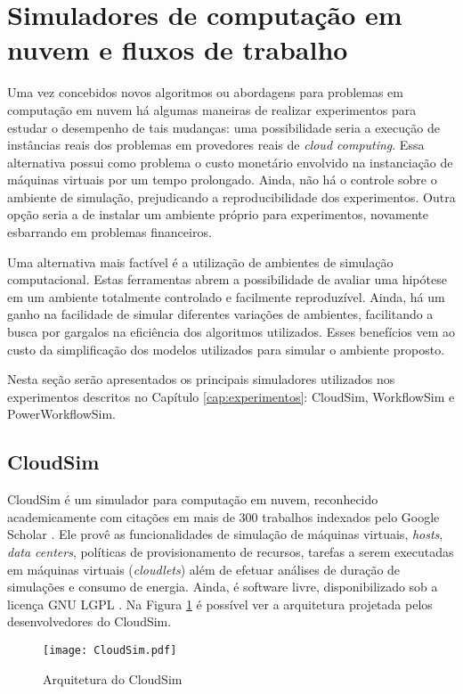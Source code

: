 \section{Simuladores de computação em nuvem e fluxos de trabalho}
\label{sec:ambiente_simulacao}
Uma vez concebidos novos algoritmos ou abordagens para problemas em computação
em nuvem há algumas maneiras de realizar experimentos para estudar o desempenho
de tais mudanças: uma possibilidade seria a execução de instâncias
reais dos problemas em provedores reais de \emph{cloud computing}. Essa alternativa
possui como problema o custo monetário envolvido na instanciação de máquinas
virtuais por um tempo prolongado. Ainda, não há o controle sobre o ambiente 
de simulação, prejudicando a reproducibilidade dos experimentos. Outra opção
seria a de instalar um ambiente próprio para experimentos, novamente esbarrando
em problemas financeiros. 

Uma alternativa mais factível é a utilização de ambientes de simulação computacional.
Estas ferramentas abrem a possibilidade de avaliar uma hipótese em um ambiente
totalmente controlado e facilmente reproduzível. Ainda, há um ganho na facilidade
de simular diferentes variações de ambientes, facilitando a busca por gargalos
na eficiência dos algoritmos utilizados. Esses benefícios vem ao custo da
simplificação dos modelos utilizados para simular o ambiente proposto.

Nesta seção serão apresentados os principais simuladores utilizados nos 
experimentos descritos no Capítulo \ref{cap:experimentos}: CloudSim, WorkflowSim
e PowerWorkflowSim.

\subsection{CloudSim}
CloudSim \cite{calheiros:cloudsim} é um simulador para computação em nuvem,
reconhecido academicamente com citações em mais de 300 trabalhos indexados
pelo Google Scholar \cite{google:cloudsim}. Ele provê as funcionalidades
de simulação de máquinas virtuais, \emph{hosts}, \emph{data centers}, políticas
de provisionamento de recursos, tarefas a serem executadas em máquinas virtuais
(\emph{cloudlets}) além de efetuar análises de duração de simulações e consumo
de energia. Ainda, é software livre, disponibilizado sob a licença GNU LGPL
\cite{cloudsim:site}. Na Figura \ref{fig:arquitetura_cloudsim} é possível ver a
arquitetura projetada pelos desenvolvedores do CloudSim. 

\begin{figure}[ht]
\centering
\texttt{[image: CloudSim.pdf]}
\caption{Arquitetura do CloudSim}
\label{fig:arquitetura_cloudsim}
\end{figure}

